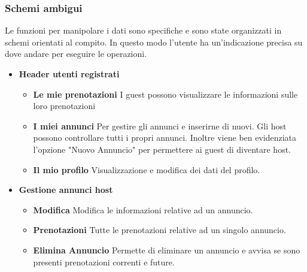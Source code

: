 \documentclass[1_relazione.tex]{subfiles}
\begin{document}
\subsubsection{Schemi ambigui}
Le funzioni per manipolare i dati sono specifiche e sono state organizzati in schemi orientati al compito. In questo modo l'utente ha un'indicazione precisa su dove andare per eseguire le operazioni.

\begin{itemize}
\item \textbf{Header utenti registrati}
\begin{itemize}
\item \textbf{Le mie prenotazioni} I guest possono visualizzare le informazioni sulle loro prenotazioni
\item \textbf{I miei annunci} Per gestire gli annunci e inserirne di nuovi. Gli host possono controllare tutti i propri annunci. Inoltre viene ben evidenziata l'opzione "Nuovo Annuncio" per permettere ai guest di diventare host.
\item \textbf{Il mio profilo} Visualizzazione e modifica dei dati del profilo. 
\end{itemize}

\item \textbf{Gestione annunci host}
\begin{itemize}
\item \textbf{Modifica} Modifica le informazioni relative ad un annuncio.
\item \textbf{Prenotazioni} Tutte le prenotazioni relative ad un singolo annuncio.
\item \textbf{Elimina Annuncio} Permette di eliminare un annuncio e avvisa se sono presenti prenotazioni correnti e future.
\end{itemize}
\end{itemize}
\end{document}
